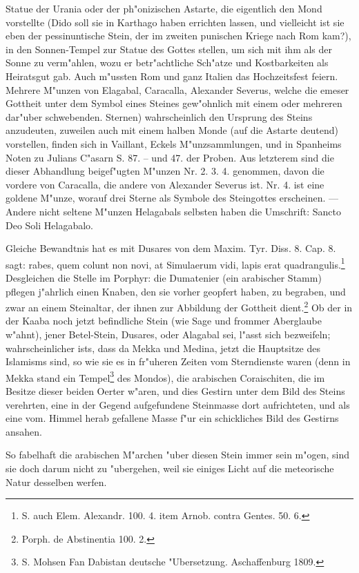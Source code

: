\documentclass[a4paper, 11pt, oneside, polutonikogreek, german]{article}
\begin{document}
Statue der Urania oder der ph"onizischen Astarte, die eigentlich den Mond vorstellte (Dido soll sie in Karthago haben errichten lassen, und vielleicht ist sie eben der pessinuntische Stein, der im zweiten punischen Kriege nach Rom kam?), in den Sonnen-Tempel zur Statue des Gottes stellen, um sich mit ihm als der Sonne zu verm"ahlen, wozu er betr"achtliche Sch"atze und Kostbarkeiten als Heiratsgut gab. Auch m"ussten Rom und ganz Italien das Hochzeitsfest feiern. Mehrere M"unzen von Elagabal, Caracalla, Alexander Severus, welche die emeser Gottheit unter dem Symbol eines Steines gew"ohnlich mit einem oder mehreren dar"uber schwebenden. Sternen) wahrscheinlich den Ursprung des Steins anzudeuten, zuweilen auch mit einem halben Monde (auf die Astarte deutend) vorstellen, finden sich in Vaillant, Eckels M"unzsammlungen, und in Spanheims Noten zu Julians C"asarn S. 87. -- und 47. der Proben. Aus letzterem sind die dieser Abhandlung beigef"ugten M"unzen Nr. 2. 3. 4. genommen, davon die vordere von Caracalla, die andere von Alexander Severus ist. Nr. 4. ist eine goldene M"unze, worauf drei Sterne als Symbole des Steingottes erscheinen. --- Andere nicht seltene M"unzen Helagabals selbsten haben die Umschrift: Sancto Deo Soli Helagabalo.

Gleiche Bewandtnis hat es mit Dusares von dem Maxim. Tyr. Diss. 8. Cap. 8. sagt: rabes, quem colunt non novi, at Simulaerum vidi, lapis erat quadrangulis.\footnote{S. auch Elem. Alexandr. 100. 4. item Arnob. contra Gentes. 50. 6.} Desgleichen die Stelle im Porphyr: die Dumatenier (ein arabischer Stamm) pflegen j"ahrlich einen Knaben, den sie vorher geopfert haben, zu begraben, und zwar an einem Steinaltar, der ihnen zur Abbildung der Gottheit dient.\footnote{Porph. de Abstinentia 100. 2.} Ob der in der Kaaba noch jetzt befindliche Stein (wie Sage und frommer Aberglaube w"ahnt), jener Betel-Stein, Dusares, oder Alagabal sei, l"asst sich bezweifeln; wahrscheinlicher ists, dass da Mekka und Medina, jetzt die Hauptsitze des Islamisms sind, so wie sie es in fr"uheren Zeiten vom Sterndienste waren (denn in Mekka stand ein Tempel\footnote{S. Mohsen Fan Dabistan deutsche "Ubersetzung. Aschaffenburg 1809.} des Mondos), die arabischen Coraischiten, die im Besitze dieser beiden Oerter w"aren, und dies Gestirn unter dem Bild des Steins verehrten, eine in der Gegend aufgefundene Steinmasse dort aufrichteten, und als eine vom. Himmel herab gefallene Masse f"ur ein schickliches Bild des Gestirns ansahen.

So fabelhaft die arabischen M"archen "uber diesen Stein immer sein m"ogen, sind sie doch darum nicht zu "ubergehen, weil sie einiges Licht auf die meteorische Natur desselben werfen.
\end{document}
